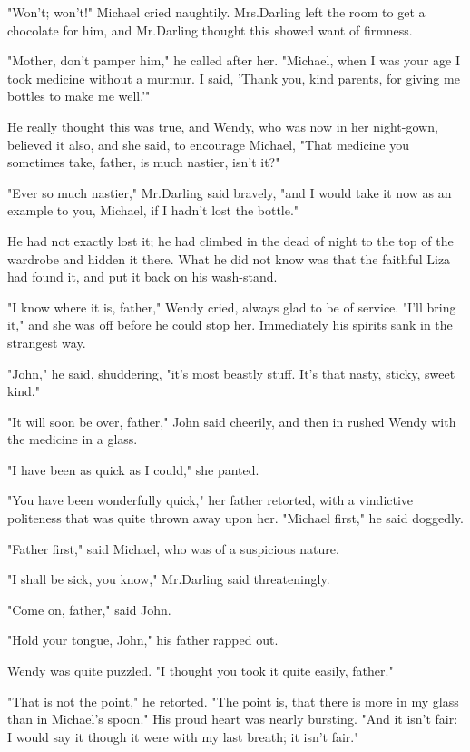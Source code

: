 "Won't;
won't!\@" Michael cried naughtily.
Mrs.\@ Darling left the room to get a chocolate for him, and Mr.\@ Darling thought this showed want of firmness.

"Mother, don't pamper him," he called after her.
"Michael, when I was your age I took medicine without a murmur.
I said, 'Thank you, kind parents, for giving me bottles to make me well.'"

He really thought this was true, and Wendy, who was now in her night-gown, believed it also, and she said, to encourage Michael, "That medicine you sometimes take, father, is much nastier, isn't it?"

"Ever so much nastier," Mr.\@ Darling said bravely, "and I would take it now as an example to you, Michael, if I hadn't lost the bottle."

He had not exactly lost it;
he had climbed in the dead of night to the top of the wardrobe and hidden it there.
What he did not know was that the faithful Liza had found it, and put it back on his wash-stand.

"I know where it is, father," Wendy cried, always glad to be of service.
"I'll bring it," and she was off before he could stop her.
Immediately his spirits sank in the strangest way.

"John," he said, shuddering, "it's most beastly stuff.
It's that nasty, sticky, sweet kind."

"It will soon be over, father," John said cheerily, and then in rushed Wendy with the medicine in a glass.

"I have been as quick as I could," she panted.

"You have been wonderfully quick," her father retorted, with a vindictive politeness that was quite thrown away upon her.
"Michael first," he said doggedly.

"Father first," said Michael, who was of a suspicious nature.

"I shall be sick, you know," Mr.\@ Darling said threateningly.

"Come on, father," said John.

"Hold your tongue, John," his father rapped out.

Wendy was quite puzzled.
"I thought you took it quite easily, father."

"That is not the point," he retorted.
"The point is, that there is more in my glass than in Michael's spoon."
His proud heart was nearly bursting.
"And it isn't fair:
I would say it though it were with my last breath;
it isn't fair."

